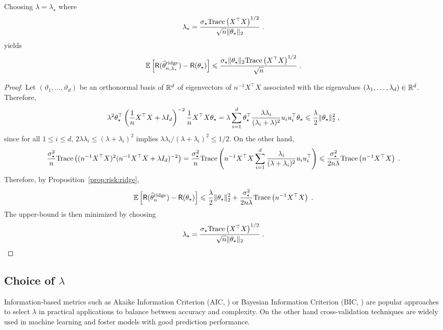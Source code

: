 \begin{proposition}
Choosing $\lambda = \lambda_\star$ where 
$$
\lambda_\star = \frac{\sigma_\star \mathrm{Trace}\left(X^\top X\right)^{1/2}}{\sqrt{n}\|\theta_\star\|_2} \;.
$$
yields
$$
\mathbb{E}\left[\mathsf{R}(\widehat {\theta}^{\mathrm{ridge}}_{n,\lambda_\star}) - \mathsf{R}(\theta_\star)\right]  \leqslant \frac{\sigma_\star \|\theta_\star\|_2 \mathrm{Trace}\left(X^\top X\right)^{1/2}}{\sqrt{n}}  \;.
$$
\end{proposition}
\begin{proof}
Let $(\vartheta_1,\ldots,\vartheta_d)$ be an orthonormal basis of $\mathbb{R}^d$ of eigenvectors of $n^{-1}X^\top X$ associated with the eigenvalues $(\lambda_1,\ldots,\lambda_d)\in\mathbb{R}^d$. Therefore,
$$
 \lambda^2\theta_\star^\top\left(\frac{1}{n}X^\top X + \lambda I_d\right)^{-2} \frac{1}{n}X^\top X \theta_\star = \lambda\sum_{i=1}^d \theta_\star^\top \frac{\lambda \lambda_i}{(\lambda_i + \lambda)^2} u_iu_i^\top \theta_\star \leqslant  \frac{\lambda}{2}\|\theta_\star\|_2^2\;,
$$
since for all $1\leqslant i \leqslant d$, $2\lambda \lambda_i \leqslant (\lambda + \lambda_i)^2$ implies $\lambda \lambda_i/(\lambda + \lambda_i)^2 \leqslant 1/2$. On the other hand,
$$
\frac{\sigma_\star^{2}}{n}\mathrm{Trace}\left((n^{-1}X^\top X)^2(n^{-1}X^\top X + \lambda I_d)^{-2}\right) = \frac{\sigma_\star^{2}}{n}\mathrm{Trace}\left(n^{-1}X^\top X\sum_{i=1}^d\frac{\lambda_i}{(\lambda + \lambda_i)^2}u_iu_i^\top\right) \leqslant \frac{\sigma_\star^{2}}{2n\lambda }\mathrm{Trace}\left(n^{-1}X^\top X\right) \;.
$$
Therefore, by Proposition~\ref{prop:risk:ridge},
$$
\mathbb{E}\left[\mathsf{R}(\widehat {\theta}^{\mathrm{ridge}}_n) - \mathsf{R}(\theta_\star)\right]  \leqslant \frac{\lambda}{2}\|\theta_\star\|_2^2 + \frac{\sigma_\star^{2}}{2n\lambda}\mathrm{Trace}\left(n^{-1}X^\top X\right)\;.
$$
The upper-bound is then minimized by choosing 
$$
\lambda_\star = \frac{\sigma_\star \mathrm{Trace}\left(X^\top X\right)^{1/2}}{\sqrt{n}\|\theta_\star\|_2} \;.
$$
\end{proof}

\subsection{Choice of $\lambda$}
Information-based metrics such as Akaike Information Criterion (AIC, \cite{akaike1974new}) or Bayesian Information Criterion (BIC, \cite{schwarz1978estimating}) are popular approaches to select $\lambda$ in practical applications to balance between accuracy and complexity. On the other hand cross-validation techniques are widely used in machine learning and foster models with good prediction performance.

